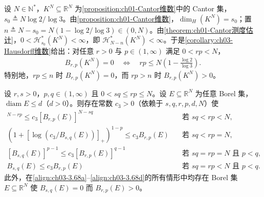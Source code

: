 \documentclass[../../main.tex]{subfiles}%
\begin{document}
\begin{example}\label{example:ch03-Cantor容量}
设 $N\in\mathbb{N}^*$，$K^N\subseteq\mathbb{R}^N$ 为\cref{proposition:ch01-Cantor维数}中的 Cantor 集，$s_0\triangleq N\log2/\log3$。由\cref{proposition:ch01-Cantor维数}，$\dim_H(K^N)=s_0$；置 $n\triangleq N-s_0=N(1-\log2/\log3)\in(0,N)$。由\cref{theorem:ch01-Cantor测度估计}，$0<\mathcal{H}^*_{s_0}(K^N)<\infty$，即 $\mathcal{H}^*_{N-n}(K^N)<\infty$。于是\cref{corollary:ch03-Hausdorff维数}给出：对任意 $r>0$ 与 $p\in(1,\infty)$ 满足 $0<rp<N$，
\begin{align*}
B_{r,p}(K^N)=0\quad\Longleftrightarrow\quad rp\leqslant N\left(1-\frac{\log2}{\log3}\right).
\end{align*}
特别地，$rp\leqslant n$ 时 $B_{r,p}(K^N)=0$，而 $rp>n$ 时 $B_{r,p}(K^N)>0$。
\end{example}

\begin{theorem}\label{theorem:ch03-容量比较}\label{theorem:ch03-容量单调}
设 $r,s>0$，$p,q\in(1,\infty)$ 且 $0<sq\leqslant rp\leqslant N$。设 $E\subseteq\mathbb{R}^N$ 为任意 Borel 集，$\operatorname{diam}E\leqslant d$（$d>0$）。则存在常数 $c_3>0$（依赖于 $s,q,r,p,d,N$）使
\begin{align}
[B_{s,q}(E)]^{N-rp}\leqslant c_3[B_{r,p}(E)]^{N-sq}
&\quad\text{若 }sq<rp<N,\label{align:ch03-3.68a}\\
(1+[\log(c_3/B_{s,q}(E))]_+)^{1-p}\leqslant c_3B_{r,p}(E)
&\quad\text{若 }sq<rp=N,\label{align:ch03-3.68b}\\
[B_{s,q}(E)]^{p-1}\leqslant c_3[B_{r,p}(E)]^{q-1}
&\quad\text{若 }sq=rp=N\text{ 且 }p<q,\label{align:ch03-3.68c}\\
B_{s,q}(E)\leqslant c_3B_{r,p}(E)
&\quad\text{若 }sq=rp<N\text{ 且 }p<q.\label{align:ch03-3.68d}
\end{align}
此外，在\eqref{align:ch03-3.68a}--\eqref{align:ch03-3.68d}的所有情形中均存在 Borel 集 $E\subseteq\mathbb{R}^N$ 使 $B_{s,q}(E)=0$ 而 $B_{r,p}(E)>0$。
\end{theorem}
\end{document}
